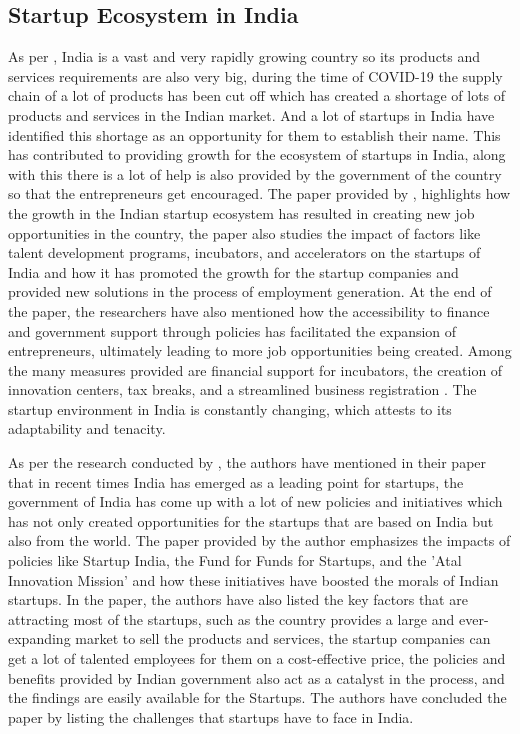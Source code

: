 \documentclass[12pt]{article}
\begin{document}
\subsection{Startup Ecosystem in India}
As per \citep{parthasarathy2022decision}, India is a vast and very rapidly growing country so its products and services requirements are also very big, during the time of COVID-19 the supply chain of a lot of products has been cut off which has created a shortage of lots of products and services in the Indian market. And a lot of startups in India have identified this shortage as an opportunity for them to establish their name. This has contributed to providing growth for the ecosystem of startups in India, along with this there is a lot of help is also provided by the government of the country so that the entrepreneurs get encouraged. The paper provided by \citep{eliganurstudy}, highlights how the growth in the Indian startup ecosystem has resulted in creating new job opportunities in the country, the paper also studies the impact of factors like talent development programs, incubators, and accelerators on the startups of India and how it has promoted the growth for the startup companies and provided new solutions in the process of employment generation. At the end of the paper, the researchers have also mentioned how the accessibility to finance and government support through policies has facilitated the expansion of entrepreneurs, ultimately leading to more job opportunities being created. Among the many measures provided are financial support for incubators, the creation of innovation centers, tax breaks, and a streamlined business registration  \citep{korreck2019indian}. The startup environment in India is constantly changing, which attests to its adaptability and tenacity.

As per the research conducted by \citep{shah2023study}, the authors have mentioned in their paper that in recent times India has emerged as a leading point for startups, the government of India has come up with a lot of new policies and initiatives which has not only created opportunities for the startups that are based on India but also from the world. The paper provided by the author emphasizes the impacts of policies like Startup India, the Fund for Funds for Startups, and the 'Atal Innovation Mission' and how these initiatives have boosted the morals of Indian startups. In the paper, the authors have also listed the key factors that are attracting most of the startups, such as the country provides a large and ever-expanding market to sell the products and services, the startup companies can get a lot of talented employees for them on a cost-effective price, the policies and benefits provided by Indian government also act as a catalyst in the process, and the findings are easily available for the Startups. The authors have concluded the paper by listing the challenges that startups have to face in India. 
\end{document}
